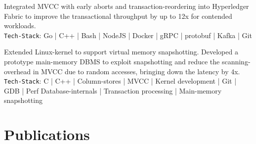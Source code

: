 \documentclass[]{deedy-resume-openfont}
\begin{document}
\begin{minipage}[t]{0.67\textwidth}
\sectionsep

Integrated MVCC with early aborts and transaction-reordering into Hyperledger Fabric to improve the transactional throughput by up to 12x for contended workloads.\\
\texttt{Tech-Stack}: Go | C++ | Bash | NodeJS | Docker | gRPC | protobuf | Kafka | Git

\sectionsep

Extended Linux-kernel to support virtual memory snapshotting. Developed a prototype main-memory DBMS to exploit snapshotting and reduce the scanning-overhead in MVCC due to random accesses, bringing down the latency by 4x.\\
\texttt{Tech-Stack}: C | C++ | Column-stores | MVCC | Kernel development | Git | GDB | Perf Database-internals | Transaction processing | Main-memory snapshotting


\section{Publications} 
\vspace*{0.65cm}
\renewcommand\refname{\vskip -1.5cm} %


\nocite{*}


\end{minipage} 
\end{document}
